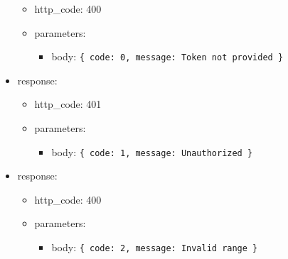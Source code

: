 \documentclass[
]{article}
\begin{document}
\begin{itemize}
  \begin{itemize}
  \item
    http\_code: 400
  \item
    parameters:

    \begin{itemize}
    \item
      body: \texttt{\{
      \textquotesingle{}code\textquotesingle{}:\ 0,\ 
      \textquotesingle{}message\textquotesingle{}:\ \textquotesingle{}Token\ not\ provided\textquotesingle{}
      \}}
    \end{itemize}
  \end{itemize}
\item
  response:

  \begin{itemize}
  \item
    http\_code: 401
  \item
    parameters:

    \begin{itemize}
    \item
      body: \texttt{\{
      \textquotesingle{}code\textquotesingle{}:\ 1,\ 
      \textquotesingle{}message\textquotesingle{}:\ \textquotesingle{}Unauthorized\textquotesingle{}
      \}}
    \end{itemize}
  \end{itemize}
\item
  response:

  \begin{itemize}
  \item
    http\_code: 400
  \item
    parameters:

    \begin{itemize}
    \item
      body: \texttt{\{
      \textquotesingle{}code\textquotesingle{}:\ 2,\ 
      \textquotesingle{}message\textquotesingle{}:\ \textquotesingle{}Invalid\ range\textquotesingle{}
      \}}
    \end{itemize}
  \end{itemize}
\end{itemize}
\end{document}
